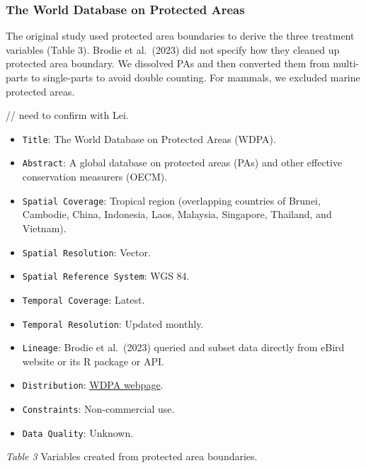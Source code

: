 \documentclass[
]{article}
\providecommand{\tightlist}{%
  \setlength{\itemsep}{0pt}\setlength{\parskip}{0pt}}
\begin{document}
\hypertarget{the-world-database-on-protected-areas}{%
\subsubsection{The World Database on Protected
Areas}\label{the-world-database-on-protected-areas}}

The original study used protected area boundaries to derive the three
treatment variables (Table 3). Brodie et al.~(2023) did not specify how
they cleaned up protected area boundary. We dissolved PAs and then
converted them from multi-parts to single-parts to avoid double
counting. For mammals, we excluded marine protected areas.

// need to confirm with Lei.

\begin{itemize}
\tightlist
\item
  \texttt{Title}: The World Database on Protected Areas (WDPA).
\item
  \texttt{Abstract}: A global database on protected areas (PAs) and
  other effective conservation measurers (OECM).
\item
  \texttt{Spatial\ Coverage}: Tropical region (overlapping countries of
  Brunei, Cambodie, China, Indonesia, Laos, Malaysia, Singapore,
  Thailand, and Vietnam).
\item
  \texttt{Spatial\ Resolution}: Vector.
\item
  \texttt{Spatial\ Reference\ System}: WGS 84.
\item
  \texttt{Temporal\ Coverage}: Latest.
\item
  \texttt{Temporal\ Resolution}: Updated monthly.
\item
  \texttt{Lineage}: Brodie et al.~(2023) queried and subset data
  directly from eBird website or its R package or API.
\item
  \texttt{Distribution}:
  \href{https://www.protectedplanet.net/en/thematic-areas/wdpa?tab=WDPA}{WDPA
  webpage}.
\item
  \texttt{Constraints}: Non-commercial use.
\item
  \texttt{Data\ Quality}: Unknown.
\end{itemize}

\emph{Table 3} Variables created from protected area boundaries.
\end{document}
